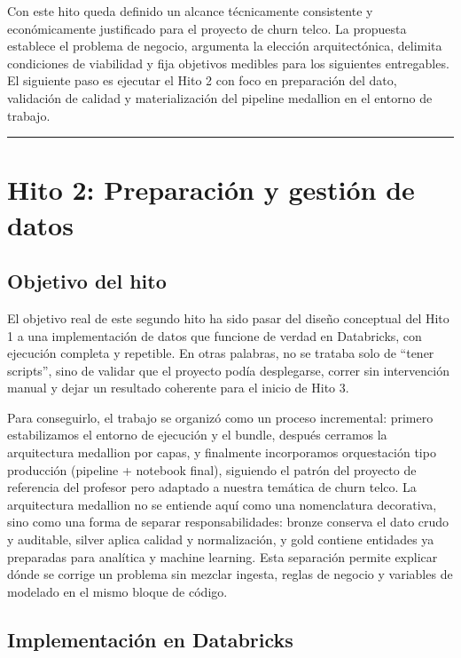 \documentclass[12pt,a4paper]{article}
\begin{document}
Con este hito queda definido un alcance técnicamente consistente y económicamente justificado para el proyecto de churn telco. La propuesta establece el problema de negocio, argumenta la elección arquitectónica, delimita condiciones de viabilidad y fija objetivos medibles para los siguientes entregables. El siguiente paso es ejecutar el Hito 2 con foco en preparación del dato, validación de calidad y materialización del pipeline medallion en el entorno de trabajo.\par

\bigskip\hrule\bigskip

\section{Hito 2: Preparación y gestión de datos}

\subsection{Objetivo del hito}

El objetivo real de este segundo hito ha sido pasar del diseño conceptual del Hito 1 a una implementación de datos que funcione de verdad en Databricks, con ejecución completa y repetible. En otras palabras, no se trataba solo de “tener scripts”, sino de validar que el proyecto podía desplegarse, correr sin intervención manual y dejar un resultado coherente para el inicio de Hito 3.\par

Para conseguirlo, el trabajo se organizó como un proceso incremental: primero estabilizamos el entorno de ejecución y el bundle, después cerramos la arquitectura medallion por capas, y finalmente incorporamos orquestación tipo producción (pipeline + notebook final), siguiendo el patrón del proyecto de referencia del profesor pero adaptado a nuestra temática de churn telco. La arquitectura medallion no se entiende aquí como una nomenclatura decorativa, sino como una forma de separar responsabilidades: bronze conserva el dato crudo y auditable, silver aplica calidad y normalización, y gold contiene entidades ya preparadas para analítica y machine learning. Esta separación permite explicar dónde se corrige un problema sin mezclar ingesta, reglas de negocio y variables de modelado en el mismo bloque de código.\par

\subsection{Implementación en Databricks}
\end{document}
